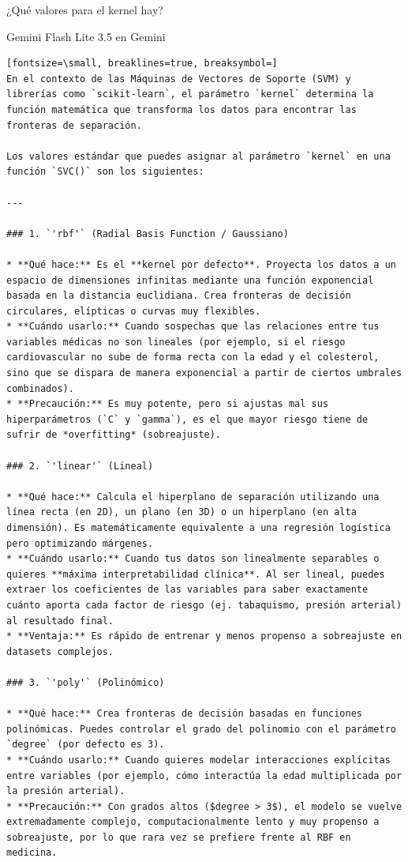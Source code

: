 \documentclass[12pt,a4paper,oneside]{book}
\begin{document}
\begin{iaprompt}
¿Qué valores para el kernel hay?
\end{iaprompt}
\begin{iaresp}{Gemini Flash Lite 3.5 en Gemini}
\begin{Verbatim}[fontsize=\small, breaklines=true, breaksymbol=]
En el contexto de las Máquinas de Vectores de Soporte (SVM) y librerías como `scikit-learn`, el parámetro `kernel` determina la función matemática que transforma los datos para encontrar las fronteras de separación.

Los valores estándar que puedes asignar al parámetro `kernel` en una función `SVC()` son los siguientes:

---

### 1. `'rbf'` (Radial Basis Function / Gaussiano)

* **Qué hace:** Es el **kernel por defecto**. Proyecta los datos a un espacio de dimensiones infinitas mediante una función exponencial basada en la distancia euclidiana. Crea fronteras de decisión circulares, elípticas o curvas muy flexibles.
* **Cuándo usarlo:** Cuando sospechas que las relaciones entre tus variables médicas no son lineales (por ejemplo, si el riesgo cardiovascular no sube de forma recta con la edad y el colesterol, sino que se dispara de manera exponencial a partir de ciertos umbrales combinados).
* **Precaución:** Es muy potente, pero si ajustas mal sus hiperparámetros (`C` y `gamma`), es el que mayor riesgo tiene de sufrir de *overfitting* (sobreajuste).

### 2. `'linear'` (Lineal)

* **Qué hace:** Calcula el hiperplano de separación utilizando una línea recta (en 2D), un plano (en 3D) o un hiperplano (en alta dimensión). Es matemáticamente equivalente a una regresión logística pero optimizando márgenes.
* **Cuándo usarlo:** Cuando tus datos son linealmente separables o quieres **máxima interpretabilidad clínica**. Al ser lineal, puedes extraer los coeficientes de las variables para saber exactamente cuánto aporta cada factor de riesgo (ej. tabaquismo, presión arterial) al resultado final.
* **Ventaja:** Es rápido de entrenar y menos propenso a sobreajuste en datasets complejos.

### 3. `'poly'` (Polinómico)

* **Qué hace:** Crea fronteras de decisión basadas en funciones polinómicas. Puedes controlar el grado del polinomio con el parámetro `degree` (por defecto es 3).
* **Cuándo usarlo:** Cuando quieres modelar interacciones explícitas entre variables (por ejemplo, cómo interactúa la edad multiplicada por la presión arterial).
* **Precaución:** Con grados altos ($degree > 3$), el modelo se vuelve extremadamente complejo, computacionalmente lento y muy propenso a sobreajuste, por lo que rara vez se prefiere frente al RBF en medicina.


\end{Verbatim}
\end{iaresp}
\end{document}
